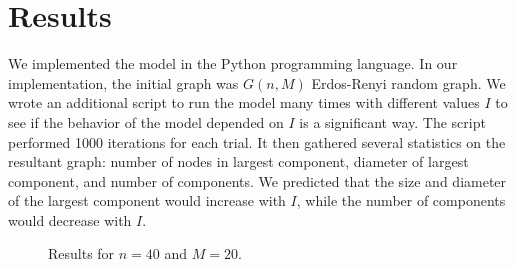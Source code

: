 \documentclass[a4paper,10pt]{article}
\begin{document}
\section{Results}

We implemented the model in the Python programming language. In our implementation, the initial graph was $G(n, M)$ Erdos-Renyi random graph. We wrote an additional script to run the model many times with different values $I$ to see if the behavior of the model depended on $I$ is a significant way. The script performed 1000 iterations for each trial. It then gathered several statistics on the resultant graph: number of nodes in largest component, diameter of largest component, and number of components. We predicted that the size and diameter of the largest component would increase with $I$, while the number of components would decrease with $I$. 

\begin{figure}[H]
\begin{center}
\hspace{1cm}
\caption{Results for $n = 40$ and $M = 20$.}
\end{center}
\end{figure} 
\end{document}
